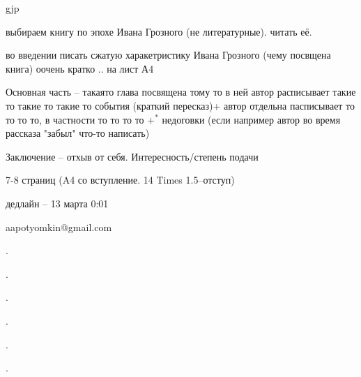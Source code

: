 gjp	 \documentclass[12pt,a4paper]{article}
\begin{document}
\begin{Huge}
\begin{center}выбираем книгу по эпохе Ивана Грозного (не литературные). читать её. 

во введении писать сжатую харакетристику Ивана Грозного (чему посвщена книга) оочень кратко .. на лист А4

Основная часть -- такаято глава посвящена тому то в ней автор расписывает такие то такие то такие то события (краткий пересказ)+ автор отдельна пасписывает то то то то, в частности то то то то $+^*$ недоговки (если например автор во время рассказа "забыл" что-то написать)

Заключение -- отхыв от себя. Интересность/степень подачи


7-8 страниц (A4 со вступление. 14 Times 1.5--отступ)

дедлайн -- 13 марта 0:01

aapotyomkin@gmail.com


\end{center}
\end{Huge}
.

.

.

.

.

.
\end{document}
